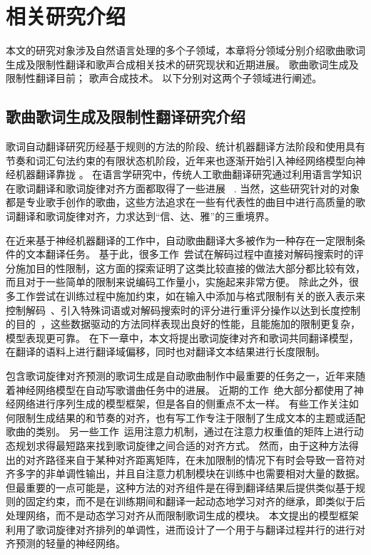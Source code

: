 \chapter{相关研究介绍}
本文的研究对象涉及自然语言处理的多个子领域，本章将分领域分别介绍歌曲歌词生成及限制性翻译和歌声合成相关技术的研究现状和近期进展。
歌曲歌词生成及限制性翻译目前；
歌声合成技术。
以下分别对这两个子领域进行阐述。
\section{歌曲歌词生成及限制性翻译研究介绍}
歌词自动翻译研究历经基于规则的方法的阶段、统计机器翻译方法阶段和使用具有节奏和词汇句法约束的有限状态机阶段\citep{spanish_verse, Manurung2004AnEA, He_Zhou_Jiang_2012}，近年来也逐渐开始引入神经网络模型向神经机器翻译靠拢
\citep{ghazvininejad-etal-2016-generating,ghazvininejad-etal-2017-hafez, ghazvininejad-etal-2018-neural}。
在语言学研究中，传统人工歌曲翻译研究通过利用语言学知识在歌词翻译和歌词旋律对齐方面都取得了一些进展
~\citep{interplay_lyrics_melody,low_2003,low2008translating,low_2022,three_d_of_singability,trans_of_music}.
当然，这些研究针对的对象都是专业歌手创作的歌曲，这些方法追求在一些有代表性的曲目中进行高质量的歌词翻译和歌词旋律对齐，力求达到``信、达、雅''的三重境界。

在近来基于神经机器翻译的工作\citep{gagast}中，自动歌曲翻译大多被作为一种存在一定限制条件的文本翻译任务。
基于此，很多工作~\citep{hokamp-liu-2017-lexically,lakew-etal-2019-controlling,li-etal-2020-rigid,zou_controllable}尝试在解码过程中直接对解码搜索时的评分施加目的性限制，这方面的探索证明了这类比较直接的做法大部分都比较有效，而且对于一些简单的限制来说编码工作量小，实施起来非常方便。
除此之外，很多工作尝试在训练过程中施加约束，如在输入中添加与格式限制有关的嵌入表示来控制解码~\citep{li-etal-2020-rigid}、引入特殊词语或对解码搜索时的评分进行重评分操作以达到长度控制的目的~\citep{lakew-etal-2019-controlling,saboo-baumann-2019-integration}，这些数据驱动的方法同样表现出良好的性能，且能施加的限制更复杂，模型表现更可靠。
在下一章中，本文将提出歌词旋律对齐和歌词共同翻译模型，在翻译的语料上进行翻译域偏移，同时也对翻译文本结果进行长度限制。

包含歌词旋律对齐预测的歌词生成是自动歌曲制作中最重要的任务之一，近年来随着神经网络模型在自动写歌谱曲任务中的进展。
近期的工作~\citep{lee-etal-2019-icomposer,Chen2020MelodyConditionedLG,songmass,telemelody,ai_lyricist,xue-etal-2021-deeprapper}绝大部分都使用了神经网络进行序列生成的模型框架，但是各自的侧重点不太一样。
有些工作关注如何限制生成结果的和节奏的对齐，也有写工作专注于限制了生成文本的主题或适配歌曲的类别。
另一些工作~\citep{songmass,telemelody}运用注意力机制，通过在注意力权重值的矩阵上进行动态规划求得最短路来找到歌词旋律之间合适的对齐方式。
然而，由于这种方法得出的对齐路径来自于某种对齐距离矩阵，在未加限制的情况下有时会导致一音符对齐多字的非单调性输出，并且自注意力机制模块在训练中也需要相对大量的数据。但最重要的一点可能是，这种方法的对齐组件是在得到翻译结果后提供类似基于规则的固定约束，而不是在训练期间和翻译一起动态地学习对齐的继承，即类似于后处理网络，而不是动态学习对齐从而限制歌词生成的模块。
本文提出的模型框架利用了歌词旋律对齐排列的单调性，进而设计了一个用于与翻译过程并行的进行对齐预测的轻量的神经网络。

